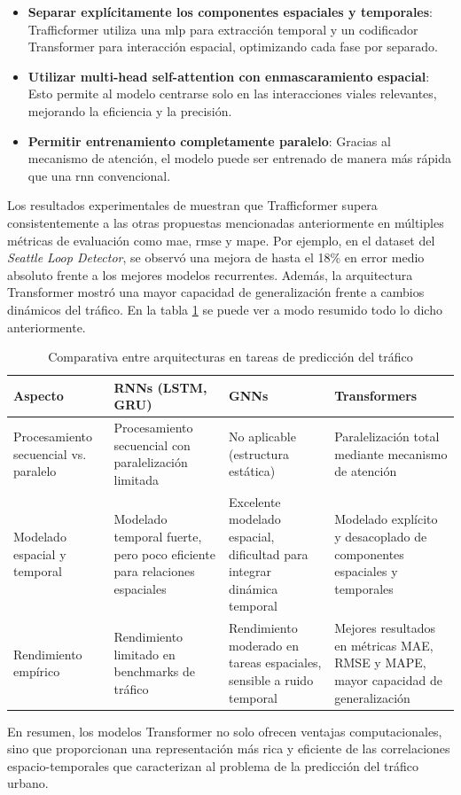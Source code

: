 \begin{itemize}
	\item \textbf{Separar explícitamente los componentes espaciales y temporales}: Trafficformer utiliza una \acrshort{mlp} para extracción temporal y un codificador Transformer para interacción espacial, optimizando cada fase por separado.
	\item \textbf{Utilizar multi-head self-attention con enmascaramiento espacial}: Esto permite al modelo centrarse solo en las interacciones viales relevantes, mejorando la eficiencia y la precisión.
	\item \textbf{Permitir entrenamiento completamente paralelo}: Gracias al mecanismo de atención, el modelo puede ser entrenado de manera más rápida que una \acrshort{rnn} convencional.
\end{itemize}

Los resultados experimentales de \cite{trafficformer} muestran que Trafficformer supera consistentemente a las otras propuestas mencionadas anteriormente en múltiples métricas de evaluación como \acrshort{mae}, \acrshort{rmse} y \acrshort{mape}. Por ejemplo, en el dataset del \textit{Seattle Loop Detector}, se observó una mejora de hasta el 18\% en error medio absoluto frente a los mejores modelos recurrentes. Además, la arquitectura Transformer mostró una mayor capacidad de generalización frente a cambios dinámicos del tráfico. En la tabla \ref{tab:comparativa_modelos} se puede ver a modo resumido todo lo dicho anteriormente.

\begin{table}[H]
	\centering
	\small
	\caption{Comparativa entre arquitecturas en tareas de predicción del tráfico}
	\label{tab:comparativa_modelos}

	\begin{tabularx}{\textwidth}{lXXX}
		\toprule
		\textbf{Aspecto} & \textbf{RNNs (LSTM, GRU)} & \textbf{GNNs} & \textbf{Transformers} \\
		\midrule
		Procesamiento secuencial vs. paralelo &
		Procesamiento secuencial con paralelización limitada &
		No aplicable (estructura estática) &
		Paralelización total mediante mecanismo de atención \\
		
		\midrule
		Modelado espacial y temporal &
		Modelado temporal fuerte, pero poco eficiente para relaciones espaciales &
		Excelente modelado espacial, dificultad para integrar dinámica temporal &
		Modelado explícito y desacoplado de componentes espaciales y temporales \\
		
		\midrule
		Rendimiento empírico &
		Rendimiento limitado en benchmarks de tráfico &
		Rendimiento moderado en tareas espaciales, sensible a ruido temporal &
		Mejores resultados en métricas MAE, RMSE y MAPE, mayor capacidad de generalización \\
		\bottomrule
	\end{tabularx}
\end{table}

En resumen, los modelos Transformer no solo ofrecen ventajas computacionales, sino que proporcionan una representación más rica y eficiente de las correlaciones espacio-temporales que caracterizan al problema de la predicción del tráfico urbano. 